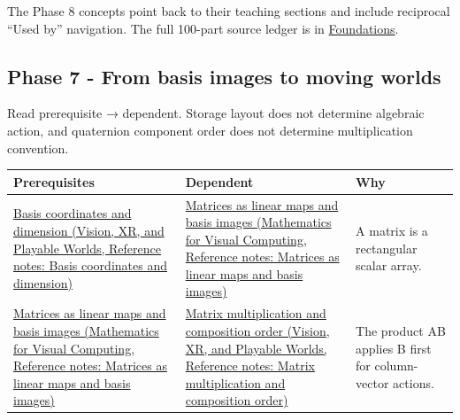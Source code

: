 The Phase 8 concepts point back to their teaching sections and include reciprocal ``Used by'' navigation. The full 100-part source ledger is in \hyperref[appendix-fd090d982a15-phase-8---parts-701-800]{Foundations}.

\subsection{Phase 7 - From basis images to moving worlds}\label{appendix-4ad47bdd269a-phase-7---from-basis-images-to-moving-worlds}

Read prerequisite → dependent. Storage layout does not determine algebraic action, and quaternion component order does not determine multiplication convention.

{\def\LTcaptype{none} %
\begin{longtable}[]{@{}
  >{\raggedright\arraybackslash}p{}
  >{\raggedright\arraybackslash}p{}
  >{\raggedright\arraybackslash}p{}@{}}
\toprule\noalign{}
\begin{minipage}[b]{\linewidth}\raggedright
Prerequisites
\end{minipage} & \begin{minipage}[b]{\linewidth}\raggedright
Dependent
\end{minipage} & \begin{minipage}[b]{\linewidth}\raggedright
Why
\end{minipage} \\
\midrule\noalign{}
\endhead
\bottomrule\noalign{}
\endlastfoot
\href{../07-Vision-XR-and-Playable-Worlds/main.pdf\#nameddest=appendix-ce0341f7ea0d}{Basis coordinates and dimension (Vision, XR, and Playable Worlds, Reference notes: Basis coordinates and dimension)} & \href{../02-Mathematics-for-Visual-Computing/main.pdf\#nameddest=appendix-bd39c3bf5d64}{Matrices as linear maps and basis images (Mathematics for Visual Computing, Reference notes: Matrices as linear maps and basis images)} & A matrix is a rectangular scalar array. \\
\href{../02-Mathematics-for-Visual-Computing/main.pdf\#nameddest=appendix-bd39c3bf5d64}{Matrices as linear maps and basis images (Mathematics for Visual Computing, Reference notes: Matrices as linear maps and basis images)} & \href{../07-Vision-XR-and-Playable-Worlds/main.pdf\#nameddest=appendix-ab31ef447dbf}{Matrix multiplication and composition order (Vision, XR, and Playable Worlds, Reference notes: Matrix multiplication and composition order)} & The product AB applies B first for column-vector actions. \\

\end{longtable}}
